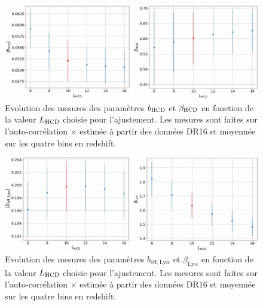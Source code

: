 \begin{figure}
  \centering
  \includegraphics[scale=0.4]{bias_hcd_vs_L0_dr16}
  \caption{Evolution des mesures des paramètres $b_{\textsc{HCD}}$ et $\beta_{\textsc{HCD}}$ en fonction de la valeur $L_{\textsc{HCD}}$ choisie pour l'ajustement.
    Les mesures sont faites sur l'auto-corrélation \lya{}$\times$\lya{} estimée à partir des données DR16 et moyennée sur les quatre bins en redshift.
    }
  \label{fig:bias_hcd_vs_L0_dr16}
\end{figure}
\begin{figure}
  \centering
  \includegraphics[scale=0.45]{bias_lya_vs_L0_dr16}
  \caption{Evolution des mesures des paramètres $b_{\mathrm{eff},\mathrm{Ly}\alpha}$ et $\beta_{\mathrm{Ly}\alpha}$ en fonction de la valeur $L_{\textsc{HCD}}$ choisie pour l'ajustement.
    Les mesures sont faites sur l'auto-corrélation \lya{}$\times$\lya{} estimée à partir des données DR16 et moyennée sur les quatre bins en redshift.
    }
  \label{fig:bias_lya_vs_L0_dr16}
\end{figure}


